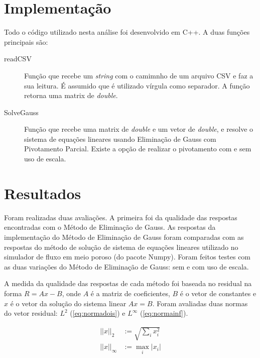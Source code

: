 \documentclass[final,5p]{elsarticle}
\numberwithin{equation}{section}
\begin{document}
\section{Implementação} \label{sec:implementacao}

        Todo o código utilizado nesta análise foi desenvolvido em C++. A duas funções principais são:

        \begin{description}
            \item[readCSV] Função que recebe um \emph{string} com o camimnho de um arquivo CSV e faz a sua leitura. É assumido que é utilizado vírgula como separador. A função retorna uma matrix de \emph{double}.
            \item[SolveGauss] Função que recebe uma matrix de \emph{double} e um vetor de \emph{double}, e resolve o sistema de equações lineares usando Eliminação de Gauss com Pivotamento Parcial. Existe a opção de realizar o pivotamento com e sem uso de escala.
        \end{description}

\section{Resultados}

        Foram realizadas duas avaliações. A primeira foi da qualidade das respostas encontradas com o Método de Eliminação de Gauss. As respostas da implementação do Método de Eliminação de Gauss foram comparadas com as respostas do método de solução de sistema de equações lineares utilizado no simulador de fluxo em meio poroso (do pacote Numpy). Foram feitos testes com as duas variações do Método de Eliminação de Gauss: sem e com uso de escala.

        A medida da qualidade das respostas de cada método foi baseada no residual na forma $R = Ax-B$, onde $A$ é a matriz de coeficientes, $B$ é o vetor de constantes e $x$ é o vetor da solução do sistema linear $Ax=B$. Foram avaliadas duas normas do vetor residual: $L^2$ (\ref{eq:normadois}) e $L^\infty$ (\ref{eq:normainf}).

        \begin{align}
            ||x||_2 &:= \sqrt{\sum_{i}x_i^2} \label{eq:normadois} \\
            ||x||_\infty &:= \max_{i} |x_i| \label{eq:normainf}
        \end{align}
\end{document}
